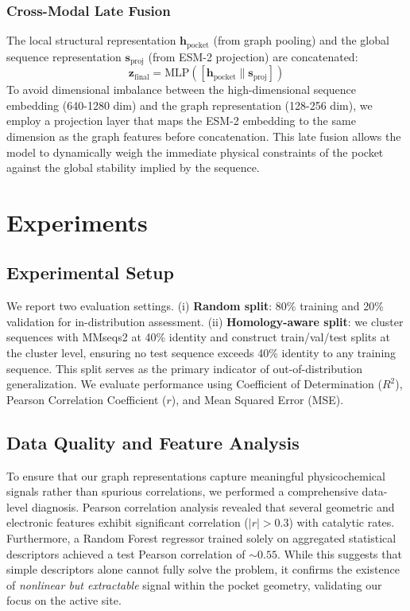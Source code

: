 \documentclass[11pt]{article}
\begin{document}
\subsubsection{Cross-Modal Late Fusion}
The local structural representation $\mathbf{h}_{\text{pocket}}$ (from graph pooling) and the global sequence representation $\mathbf{s}_{\text{proj}}$ (from ESM-2 projection) are concatenated:
\begin{equation}
    \mathbf{z}_{\text{final}} = \text{MLP}([\mathbf{h}_{\text{pocket}} \parallel \mathbf{s}_{\text{proj}}])
\end{equation}
To avoid dimensional imbalance between the high-dimensional sequence embedding (640-1280 dim) and the graph representation (128-256 dim), we employ a projection layer that maps the ESM-2 embedding to the same dimension as the graph features before concatenation. This late fusion allows the model to dynamically weigh the immediate physical constraints of the pocket against the global stability implied by the sequence.

\section{Experiments}
\label{sec:experiments}

\subsection{Experimental Setup}
We report two evaluation settings. (i) \textbf{Random split}: 80\% training and 20\% validation for in-distribution assessment. (ii) \textbf{Homology-aware split}: we cluster sequences with MMseqs2 at 40\% identity and construct train/val/test splits at the cluster level, ensuring no test sequence exceeds 40\% identity to any training sequence. This split serves as the primary indicator of out-of-distribution generalization. We evaluate performance using Coefficient of Determination ($R^2$), Pearson Correlation Coefficient ($r$), and Mean Squared Error (MSE).

\subsection{Data Quality and Feature Analysis}
\label{sec:data_analysis}

To ensure that our graph representations capture meaningful physicochemical signals rather than spurious correlations, we performed a comprehensive data-level diagnosis. Pearson correlation analysis revealed that several geometric and electronic features exhibit significant correlation ($|r| > 0.3$) with catalytic rates. Furthermore, a Random Forest regressor trained solely on aggregated statistical descriptors achieved a test Pearson correlation of $\sim0.55$. While this suggests that simple descriptors alone cannot fully solve the problem, it confirms the existence of \emph{nonlinear but extractable} signal within the pocket geometry, validating our focus on the active site.
\end{document}
